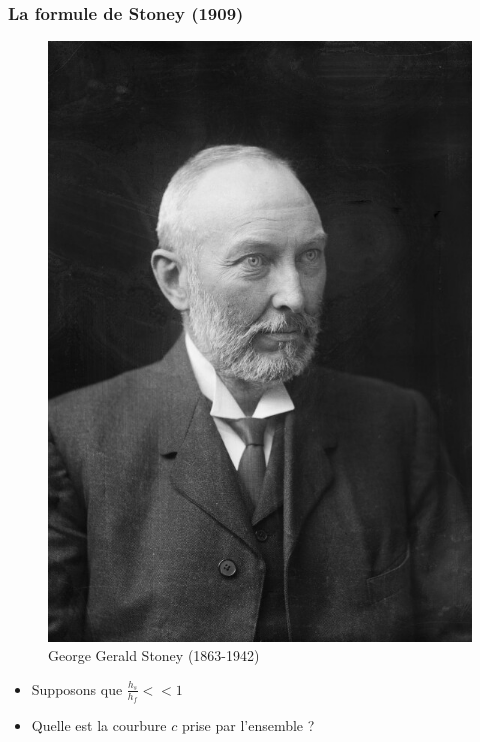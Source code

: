 \documentclass{beamer}
\begin{document}
\begin{frame}
    \frametitle{La formule de Stoney (1909)}
    
    \begin{figure}
        \centering
        \includegraphics[scale=0.07]{imgs/stoney.jpg}
        \caption{George Gerald Stoney (1863-1942)}
    \end{figure}

    \begin{itemize}
        \item Supposons que $\frac{h_s}{h_f} << 1$
        \item Quelle est la courbure $c$ prise par l'ensemble ?
    \end{itemize}
    

\end{frame}
\end{document}
